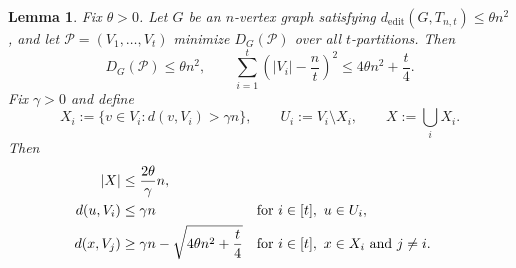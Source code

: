 \documentclass[11pt]{article}
\numberwithin{equation}{section}
\newtheorem{lemma}[theorem]{Lemma}
\theoremstyle{remark}
\newcommand{\ed}{d_{\mathrm{edit}}}
\begin{document}
\begin{lemma}\label{cov:lem:edit-partition}
Fix \(\theta>0\). Let \(G\) be an \(n\)-vertex graph satisfying \(\ed(G,T_{n,t})\le \theta n^2\),
and let \(\mathcal P=(V_1,\ldots,V_t)\) minimize \(D_G(\mathcal P)\) over all \(t\)-partitions.  Then
\begin{equation}\label{cov:eq:part-variance}
D_G(\mathcal P)\le \theta n^2, \qquad\sum_{i=1}^t\left(|V_i|-\frac nt\right)^2
 \le 4\theta n^2+\frac t4.
\end{equation}
Fix \(\gamma>0\) and define
\begin{equation*}
X_i:=\{v\in V_i:d(v,V_i)>\gamma n\},
\qquad
U_i:=V_i\setminus X_i,
\qquad
X:=\bigcup_iX_i.
\end{equation*}
Then
\begin{align}
  |X|&\le \frac{2\theta}{\gamma}n,\label{cov:eq:exceptional-size-quantitative}\\
  d(u,V_i)&\le\gamma n &&\text{for\ } i\in[t],\ u\in U_i,\notag\\
  d(x,V_j)& \ge \gamma n-\sqrt{4\theta n^2+\frac t4} &&\text{for\ }i\in[t],\ x\in X_i \text{\ and\ } j\ne i.\label{cov:eq:exceptional-cross-degree-quantitative}
\end{align}
\end{lemma}
\end{document}
